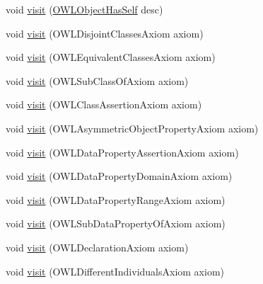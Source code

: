 \begin{DoxyCompactItemize}
void \hyperlink{classorg_1_1coode_1_1owlapi_1_1latex_1_1_latex_object_visitor_a895a10dcef6093080c4be1f65513d2ab}{visit} (\hyperlink{interfaceorg_1_1semanticweb_1_1owlapi_1_1model_1_1_o_w_l_object_has_self}{O\-W\-L\-Object\-Has\-Self} desc)
\item 
void \hyperlink{classorg_1_1coode_1_1owlapi_1_1latex_1_1_latex_object_visitor_a16f643ecbacd2a9351fd4b187331cf8c}{visit} (O\-W\-L\-Disjoint\-Classes\-Axiom axiom)
\item 
void \hyperlink{classorg_1_1coode_1_1owlapi_1_1latex_1_1_latex_object_visitor_a7c9dd628c7ae8967b656f38e80022f53}{visit} (O\-W\-L\-Equivalent\-Classes\-Axiom axiom)
\item 
void \hyperlink{classorg_1_1coode_1_1owlapi_1_1latex_1_1_latex_object_visitor_a7c2b612560dd11f678b94fcdf1b05c16}{visit} (O\-W\-L\-Sub\-Class\-Of\-Axiom axiom)
\item 
void \hyperlink{classorg_1_1coode_1_1owlapi_1_1latex_1_1_latex_object_visitor_a6a744a543a521d4641cc1fbfe08091bd}{visit} (O\-W\-L\-Class\-Assertion\-Axiom axiom)
\item 
void \hyperlink{classorg_1_1coode_1_1owlapi_1_1latex_1_1_latex_object_visitor_aca099029ab80702ad770e41b598e1258}{visit} (O\-W\-L\-Asymmetric\-Object\-Property\-Axiom axiom)
\item 
void \hyperlink{classorg_1_1coode_1_1owlapi_1_1latex_1_1_latex_object_visitor_a621e81e4a2fa71bc2c482ddf617ed782}{visit} (O\-W\-L\-Data\-Property\-Assertion\-Axiom axiom)
\item 
void \hyperlink{classorg_1_1coode_1_1owlapi_1_1latex_1_1_latex_object_visitor_a5e8e6d5231b71955070c6838be497a54}{visit} (O\-W\-L\-Data\-Property\-Domain\-Axiom axiom)
\item 
void \hyperlink{classorg_1_1coode_1_1owlapi_1_1latex_1_1_latex_object_visitor_a1ebbbb0a15ca2b41836c7583ade755e7}{visit} (O\-W\-L\-Data\-Property\-Range\-Axiom axiom)
\item 
void \hyperlink{classorg_1_1coode_1_1owlapi_1_1latex_1_1_latex_object_visitor_af360dfb752fa980b3ef3d7365bcc24bf}{visit} (O\-W\-L\-Sub\-Data\-Property\-Of\-Axiom axiom)
\item 
void \hyperlink{classorg_1_1coode_1_1owlapi_1_1latex_1_1_latex_object_visitor_a0b8daf85cdaa2619b0378fa2398bf90e}{visit} (O\-W\-L\-Declaration\-Axiom axiom)
\item 
void \hyperlink{classorg_1_1coode_1_1owlapi_1_1latex_1_1_latex_object_visitor_ab9d25d9dcafeec112f25393c9e254ec9}{visit} (O\-W\-L\-Different\-Individuals\-Axiom axiom)
\item 

\end{DoxyCompactItemize}
